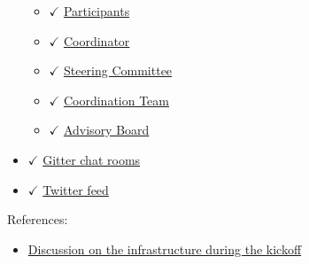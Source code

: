 \begin{itemize}
  \begin{itemize}
  \tightlist
  \item
    \(\checkmark\)
    \href{https://github.com/orgs/OpenDreamKit/teams/participants}{Participants}
  \item
    \(\checkmark\)
    \href{https://github.com/orgs/OpenDreamKit/teams/coordinator}{Coordinator}
  \item
    \(\checkmark\)
    \href{https://github.com/orgs/OpenDreamKit/teams/steering-committee}{Steering
    Committee}
  \item
    \(\checkmark\)
    \href{https://github.com/orgs/OpenDreamKit/teams/coordination}{Coordination
    Team}
  \item
    \(\checkmark\)
    \href{https://github.com/orgs/OpenDreamKit/teams/advisory}{Advisory
    Board}
  \end{itemize}
\item
  \(\checkmark\) \href{https://gitter.im/OpenDreamKit}{Gitter chat
  rooms}
\item
  \(\checkmark\) \href{https://twitter.com/opendreamkit}{Twitter feed}
\end{itemize}

References:

\begin{itemize}
\tightlist
\item
  \href{http://opendreamkit.org/meetings/2015-09-02-Kickoff/infrastructure/}{Discussion
  on the infrastructure during the kickoff}
\end{itemize}
